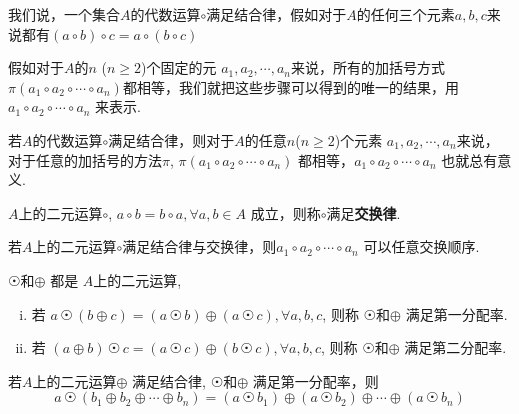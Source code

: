 \begin{Definition}[结合率]
我们说，一个集合$A$的代数运算$\circ$满足结合律，假如对于$A$的任何三个元素$a, b, c$来说都有$
(a \circ b) \circ c = a \circ (b \circ c)
$
\end{Definition}

\begin{Definition}
假如对于$A$的$n$ ($n \ge 2$)个固定的元 $a_1, a_2, \cdots, a_n$来说，所有的加括号方式 $\pi(a_1 \circ a_2 \circ \cdots \circ a_n)$都相等，我们就把这些步骤可以得到的唯一的结果，用$a_1 \circ a_2 \circ \cdots \circ a_n $ 来表示.
\end{Definition}

\begin{Theorem}
若$A$的代数运算$\circ$满足结合律，则对于$A$的任意$n$($n \ge 2$)个元素 $a_1, a_2, \cdots, a_n$来说，对于任意的加括号的方法$\pi$, $\pi(a_1 \circ a_2 \circ \cdots \circ a_n)$ 都相等，$a_1 \circ a_2 \circ \cdots \circ a_n$ 也就总有意义.
\end{Theorem}

\begin{Definition}[交换律]
$A$上的二元运算$\circ$, $a \circ b = b \circ a, \forall a, b \in A$  成立，则称$\circ$满足\textbf{交换律}. 
\end{Definition}

\begin{Theorem}
若$A$上的二元运算$\circ$满足结合律与交换律，则$a_1 \circ a_2 \circ \cdots \circ a_n$ 可以任意交换顺序.
\end{Theorem}

\begin{Definition}[分配率]
$ \astrosun $和$ \oplus $ 都是 $A$上的二元运算, 
\begin{enumerate}[i)]
\item 若
$ a \, \astrosun \, (b \oplus c) = (a \, \astrosun \, b) \oplus (a \, \astrosun \, c), \forall a, b, c $, 则称 $ \astrosun$和$ \oplus $  满足第一分配率.
\item 若
$ (a \oplus b) \, \astrosun \, c = (a \, \astrosun \, c) \oplus ( b \, \astrosun \, c), \forall a, b, c$, 则称 $ \astrosun$和$\oplus $  满足第二分配率.
\end{enumerate}
\end{Definition}

\begin{Theorem}
若$A$上的二元运算$\oplus$ 满足结合律, $ \astrosun $和$\oplus $ 满足第一分配率，则
$$
a \, \astrosun \, ( b_1 \oplus b_2 \oplus \cdots \oplus b_n ) =  ( a \, \astrosun \, b_1) \oplus (a \, \astrosun \, b_2) \oplus \cdots \oplus (a \, \astrosun \, b_n)
$$
\end{Theorem}

